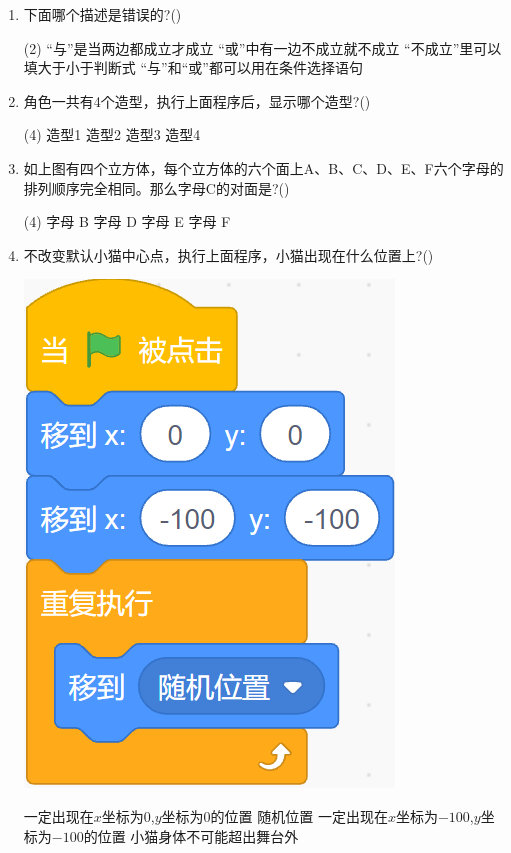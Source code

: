 \documentclass[10pt, a4paper]{article}
\begin{document}
\begin{enumerate}
        \item 下面哪个描述是错误的?(\qquad)
        \begin{tasks}(2)
            \task “与”是当两边都成立才成立
            \task “或”中有一边不成立就不成立
            \task “不成立”里可以填大于小于判断式
            \task “与”和“或”都可以用在条件选择语句
        \end{tasks}

        \item 角色一共有4个造型，执行上面程序后，显示哪个造型?(\qquad)
        \begin{tasks}(4)
            \task 造型1
            \task 造型2
            \task 造型3
            \task 造型4
        \end{tasks}

        \item 如上图有四个立方体，每个立方体的六个面上A、B、C、D、E、F六个字母的排列顺序完全相同。那么字母C的对面是?(\qquad)
        \begin{tasks}(4)
            \task 字母 B
            \task 字母 D
            \task 字母 E
            \task 字母 F
        \end{tasks}
        
        \newpage
        \item 不改变默认小猫中心点，执行上面程序，小猫出现在什么位置上?(\qquad)
        
        \begin{minipage}{.2\textwidth}
            \includegraphics[width=.55\textwidth]{15.png}
        \end{minipage}
        \begin{minipage}{.7\textwidth}
            \begin{tasks}
                \task 一定出现在$x$坐标为0,$y$坐标为0的位置
                \task 随机位置
                \task 一定出现在$x$坐标为$-100$,$y$坐标为$-100$的位置
                \task 小猫身体不可能超出舞台外
            \end{tasks}
        \end{minipage}


\end{enumerate}
\end{document}

